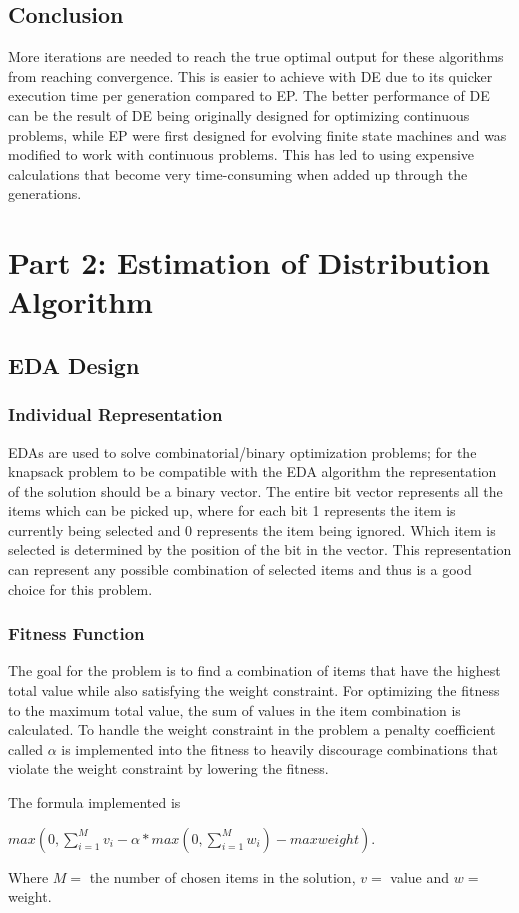 \documentclass{article}
\begin{document}
\subsection*{Conclusion}
More iterations are needed to reach the true optimal output for these algorithms from reaching convergence. This is easier to achieve with DE due to its quicker execution time per generation compared to EP. The better performance of DE can be the result of DE being originally designed for optimizing continuous problems, while EP were first designed for evolving finite state machines and was modified to work with continuous problems. This has led to using expensive calculations that become very time-consuming when added up through the generations.

\section*{Part 2: Estimation of Distribution Algorithm}
\subsection*{EDA Design}
\subsubsection*{Individual Representation}
EDAs are used to solve combinatorial/binary optimization problems; for the knapsack problem to be compatible with the EDA algorithm the representation of the solution should be a binary vector. The entire bit vector represents all the items which can be picked up, where for each bit 1 represents the item is currently being selected and 0 represents the item being ignored. Which item is selected is determined by the position of the bit in the vector. This representation can represent any possible combination of selected items and thus is a good choice for this problem. \par
\subsubsection*{Fitness Function}
The goal for the problem is to find a combination of items that have the highest total value while also satisfying the weight constraint. For optimizing the fitness to the maximum total value, the sum of values in the item combination is calculated. To handle the weight constraint in the problem a penalty coefficient called $\alpha$ is implemented into the fitness to heavily discourage combinations that violate the weight constraint by lowering the fitness. \par 
\noindent The formula implemented is 
\begin{center}
$max(0, \sum_{i=1}^{M}v_i - \alpha *max(0,\sum_{i=1}^{M}w_i)-max weight)$. 
\end{center}
Where $M=$ the number of chosen items in the solution, $v=$ value and $w=$ weight.
\end{document}
